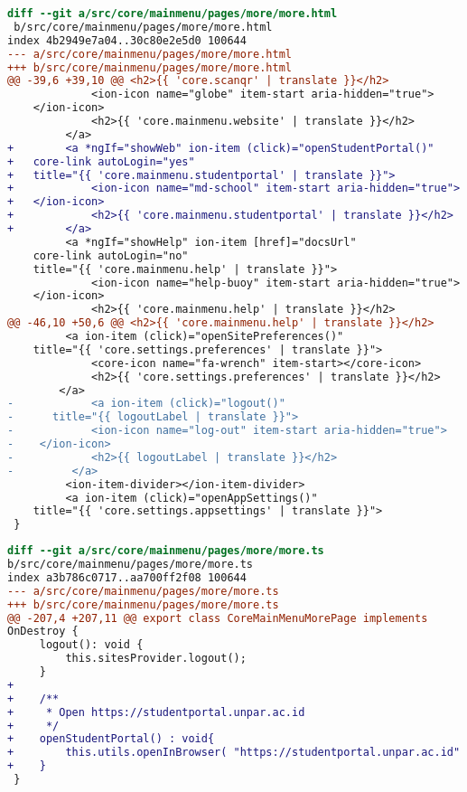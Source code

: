 \begin{lstlisting}[language=diff, frame=single, label ={more-view}, caption = Perubahan pada file \texttt{src/core/mainmenu/pages/more/more.html} ]
diff --git a/src/core/mainmenu/pages/more/more.html
 b/src/core/mainmenu/pages/more/more.html
index 4b2949e7a04..30c80e2e5d0 100644
--- a/src/core/mainmenu/pages/more/more.html
+++ b/src/core/mainmenu/pages/more/more.html
@@ -39,6 +39,10 @@ <h2>{{ 'core.scanqr' | translate }}</h2>
             <ion-icon name="globe" item-start aria-hidden="true">
	</ion-icon>
             <h2>{{ 'core.mainmenu.website' | translate }}</h2>
         </a>
+        <a *ngIf="showWeb" ion-item (click)="openStudentPortal()" 
+ 	core-link autoLogin="yes" 
+ 	title="{{ 'core.mainmenu.studentportal' | translate }}">
+            <ion-icon name="md-school" item-start aria-hidden="true">
+ 	</ion-icon>
+            <h2>{{ 'core.mainmenu.studentportal' | translate }}</h2>
+        </a>
         <a *ngIf="showHelp" ion-item [href]="docsUrl" 
	core-link autoLogin="no" 
	title="{{ 'core.mainmenu.help' | translate }}">
             <ion-icon name="help-buoy" item-start aria-hidden="true">
	</ion-icon>
             <h2>{{ 'core.mainmenu.help' | translate }}</h2>
@@ -46,10 +50,6 @@ <h2>{{ 'core.mainmenu.help' | translate }}</h2>
         <a ion-item (click)="openSitePreferences()" 
	title="{{ 'core.settings.preferences' | translate }}">
             <core-icon name="fa-wrench" item-start></core-icon>
             <h2>{{ 'core.settings.preferences' | translate }}</h2>
        </a>
-            <a ion-item (click)="logout()" 
- 	   title="{{ logoutLabel | translate }}">
-            <ion-icon name="log-out" item-start aria-hidden="true">
- 	 </ion-icon>
-            <h2>{{ logoutLabel | translate }}</h2>
-         </a>
         <ion-item-divider></ion-item-divider>
         <a ion-item (click)="openAppSettings()" 
	title="{{ 'core.settings.appsettings' | translate }}">
 }
\end{lstlisting} 

\begin{lstlisting}[language=diff, frame=single, label ={more-component}, caption = Perubahan pada file \texttt{src/core/mainmenu/pages/more/more.ts} ]
diff --git a/src/core/mainmenu/pages/more/more.ts
b/src/core/mainmenu/pages/more/more.ts
index a3b786c0717..aa700ff2f08 100644
--- a/src/core/mainmenu/pages/more/more.ts
+++ b/src/core/mainmenu/pages/more/more.ts
@@ -207,4 +207,11 @@ export class CoreMainMenuMorePage implements 
OnDestroy {
     logout(): void {
         this.sitesProvider.logout();
     }
+
+    /**
+     * Open https://studentportal.unpar.ac.id
+     */
+    openStudentPortal() : void{
+        this.utils.openInBrowser( "https://studentportal.unpar.ac.id" );
+    }
 }
\end{lstlisting} 

